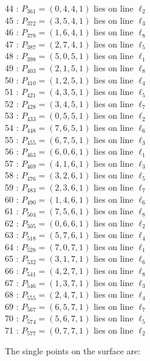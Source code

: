 \documentclass{article}
\begin{document}
{\begin{multicols}{2}
44 : $P_{361}=( 0, 4, 4, 1 )$ lies on line $\ell_{2}$\\
45 : $P_{372}=( 3, 5, 4, 1 )$ lies on line $\ell_{3}$\\
46 : $P_{378}=( 1, 6, 4, 1 )$ lies on line $\ell_{8}$\\
47 : $P_{387}=( 2, 7, 4, 1 )$ lies on line $\ell_{5}$\\
48 : $P_{398}=( 5, 0, 5, 1 )$ lies on line $\ell_{1}$\\
49 : $P_{403}=( 2, 1, 5, 1 )$ lies on line $\ell_{8}$\\
50 : $P_{410}=( 1, 2, 5, 1 )$ lies on line $\ell_{4}$\\
51 : $P_{421}=( 4, 3, 5, 1 )$ lies on line $\ell_{5}$\\
52 : $P_{428}=( 3, 4, 5, 1 )$ lies on line $\ell_{7}$\\
53 : $P_{433}=( 0, 5, 5, 1 )$ lies on line $\ell_{2}$\\
54 : $P_{448}=( 7, 6, 5, 1 )$ lies on line $\ell_{6}$\\
55 : $P_{455}=( 6, 7, 5, 1 )$ lies on line $\ell_{3}$\\
56 : $P_{463}=( 6, 0, 6, 1 )$ lies on line $\ell_{1}$\\
57 : $P_{469}=( 4, 1, 6, 1 )$ lies on line $\ell_{3}$\\
58 : $P_{476}=( 3, 2, 6, 1 )$ lies on line $\ell_{5}$\\
59 : $P_{483}=( 2, 3, 6, 1 )$ lies on line $\ell_{7}$\\
60 : $P_{490}=( 1, 4, 6, 1 )$ lies on line $\ell_{6}$\\
61 : $P_{504}=( 7, 5, 6, 1 )$ lies on line $\ell_{8}$\\
62 : $P_{505}=( 0, 6, 6, 1 )$ lies on line $\ell_{2}$\\
63 : $P_{518}=( 5, 7, 6, 1 )$ lies on line $\ell_{4}$\\
64 : $P_{528}=( 7, 0, 7, 1 )$ lies on line $\ell_{1}$\\
65 : $P_{532}=( 3, 1, 7, 1 )$ lies on line $\ell_{6}$\\
66 : $P_{541}=( 4, 2, 7, 1 )$ lies on line $\ell_{8}$\\
67 : $P_{546}=( 1, 3, 7, 1 )$ lies on line $\ell_{3}$\\
68 : $P_{555}=( 2, 4, 7, 1 )$ lies on line $\ell_{4}$\\
69 : $P_{567}=( 6, 5, 7, 1 )$ lies on line $\ell_{7}$\\
70 : $P_{574}=( 5, 6, 7, 1 )$ lies on line $\ell_{5}$\\
71 : $P_{577}=( 0, 7, 7, 1 )$ lies on line $\ell_{2}$\\
\end{multicols}
The single points on the surface are:\\
}
\end{document}
